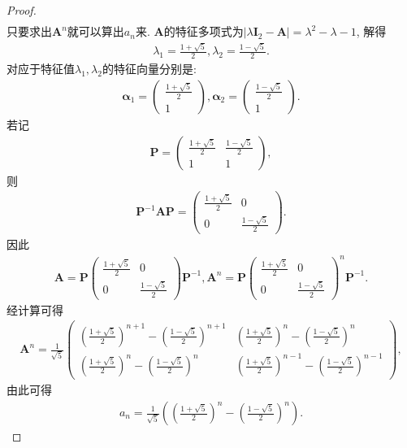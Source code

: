 \documentclass[../../main.tex]{subfiles}%
\begin{document}
\begin{proof}
\begin{align*}
\end{align*}
只要求出\(\boldsymbol{A}^{n}\)就可以算出\(a_{n}\)来. \(\boldsymbol{A}\)的特征多项式为\(\vert\lambda\boldsymbol{I}_{2}-\boldsymbol{A}\vert=\lambda^{2}-\lambda - 1\), 解得
\begin{align*}
\lambda_{1}=\frac{1 + \sqrt{5}}{2},\lambda_{2}=\frac{1 - \sqrt{5}}{2}.
\end{align*}
对应于特征值\(\lambda_{1},\lambda_{2}\)的特征向量分别是:
\begin{align*}
\boldsymbol{\alpha}_{1}=\begin{pmatrix}
\frac{1 + \sqrt{5}}{2}\\
1
\end{pmatrix},\boldsymbol{\alpha}_{2}=\begin{pmatrix}
\frac{1 - \sqrt{5}}{2}\\
1
\end{pmatrix}.
\end{align*}
若记
\begin{align*}
\boldsymbol{P}=\begin{pmatrix}
\frac{1 + \sqrt{5}}{2}&\frac{1 - \sqrt{5}}{2}\\
1&1
\end{pmatrix},
\end{align*}
则
\begin{align*}
\boldsymbol{P}^{-1}\boldsymbol{AP}=\begin{pmatrix}
\frac{1 + \sqrt{5}}{2}&0\\
0&\frac{1 - \sqrt{5}}{2}
\end{pmatrix}.
\end{align*}
因此
\begin{align*}
\boldsymbol{A}=\boldsymbol{P}\begin{pmatrix}
\frac{1 + \sqrt{5}}{2}&0\\
0&\frac{1 - \sqrt{5}}{2}
\end{pmatrix}\boldsymbol{P}^{-1},\boldsymbol{A}^{n}=\boldsymbol{P}\begin{pmatrix}
\frac{1 + \sqrt{5}}{2}&0\\
0&\frac{1 - \sqrt{5}}{2}
\end{pmatrix}^{n}\boldsymbol{P}^{-1}.
\end{align*}
经计算可得
\begin{align*}
\boldsymbol{A}^{n}=\frac{1}{\sqrt{5}}\begin{pmatrix}
\left(\frac{1 + \sqrt{5}}{2}\right)^{n + 1}-\left(\frac{1 - \sqrt{5}}{2}\right)^{n + 1}&\left(\frac{1 + \sqrt{5}}{2}\right)^{n}-\left(\frac{1 - \sqrt{5}}{2}\right)^{n}\\
\left(\frac{1 + \sqrt{5}}{2}\right)^{n}-\left(\frac{1 - \sqrt{5}}{2}\right)^{n}&\left(\frac{1 + \sqrt{5}}{2}\right)^{n - 1}-\left(\frac{1 - \sqrt{5}}{2}\right)^{n - 1}
\end{pmatrix},
\end{align*}
由此可得
\begin{align*}
a_{n}=\frac{1}{\sqrt{5}}\left(\left(\frac{1 + \sqrt{5}}{2}\right)^{n}-\left(\frac{1 - \sqrt{5}}{2}\right)^{n}\right).
\end{align*}

\end{proof}
\end{document}
